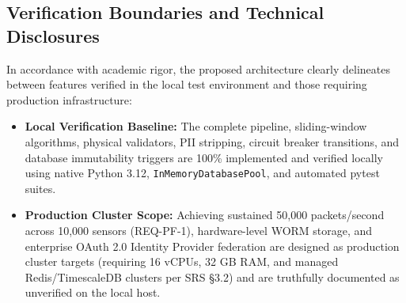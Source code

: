 \subsection{Verification Boundaries and Technical Disclosures}
In accordance with academic rigor, the proposed architecture clearly delineates between features verified in the local test environment and those requiring production infrastructure:
\begin{itemize}
    \item \textbf{Local Verification Baseline:} The complete pipeline, sliding-window algorithms, physical validators, PII stripping, circuit breaker transitions, and database immutability triggers are 100\% implemented and verified locally using native Python 3.12, \texttt{InMemoryDatabasePool}, and automated pytest suites.
    \item \textbf{Production Cluster Scope:} Achieving sustained 50,000 packets/second across 10,000 sensors (REQ-PF-1), hardware-level WORM storage, and enterprise OAuth 2.0 Identity Provider federation are designed as production cluster targets (requiring 16 vCPUs, 32 GB RAM, and managed Redis/TimescaleDB clusters per SRS §3.2) and are truthfully documented as unverified on the local host.
\end{itemize}
